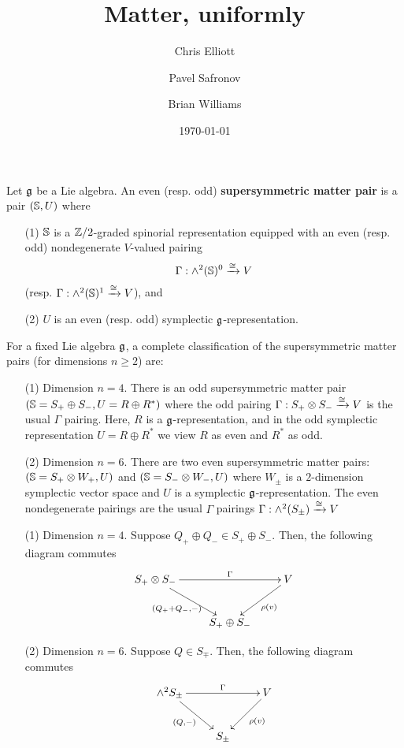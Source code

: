 \documentclass[10pt, oneside]{article}
\title{Matter, uniformly}
\author{Chris Elliott\and Pavel Safronov \and Brian Williams}
\date{\today}
\begin{document}
\maketitle

\begin{definition}
Let $\mathfrak g$ be a Lie algebra.
An even (resp. odd) {\bf supersymmetric matter pair} is a pair $(\mathbb S, U)$ where 
\begin{itemize}
\item[(1)] $\mathbb S$ is a $\mathbb Z/2$-graded spinorial representation equipped with an even (resp. odd) nondegenerate $V$-valued pairing
\[
\Gamma : \wedge^2(\mathbb S)^0 \xrightarrow{\cong} V
\]
(resp. $\Gamma : \wedge^2(\mathbb S)^1 \xrightarrow{\cong} V$), and

\item[(2)] $U$ is an even (resp. odd) symplectic $\mathfrak g$-representation.
\end{itemize}
\end{definition}

\begin{lem}
For a fixed Lie algebra $\mathfrak g$, a complete classification of the supersymmetric matter pairs  (for dimensions $n \geq 2$) are:
\begin{itemize}
\item[(1)] Dimension $n = 4$. 
There is an odd supersymmetric matter pair $(\mathbb S = S_+ \oplus S_-, U = R \oplus R^*)$ where the odd pairing $\Gamma : S_+ \otimes S_- \xrightarrow{\cong} V$ is the usual $\Gamma$ pairing. Here, $R$ is a $\mathfrak g$-representation, and in the odd symplectic representation $U = R \oplus R^*$ we view $R$ as even and $R^*$ as odd. 
\item[(2)] Dimension $n=6$.
There are two even supersymmetric matter pairs: $(\mathbb S = S_+ \otimes W_+, U)$ and $(\mathbb S = S_- \otimes W_-, U)$ where $W_\pm$ is a $2$-dimension symplectic vector space and $U$ is a symplectic $\mathfrak g$-representation. 
The even nondegenerate pairings are the usual $\Gamma$ pairings $\Gamma : \wedge^2 (S_\pm) \xrightarrow{\cong} V$ 
\end{itemize}
\end{lem}

\begin{prop}

\begin{itemize}
\item[(1)] Dimension $n = 4$.
Suppose $Q_+ \oplus Q_- \in S_+ \oplus S_-$.
Then, the following diagram commutes
\[
\xymatrix{
S_+ \otimes S_- \ar[dr]_-{(Q_+ + Q_-,-)} \ar[rr]^-{\Gamma} & & V \ar[dl]^-{\rho(v)} \\
& S_+ \oplus S_- &  
}
\]
\item[(2)] Dimension $n = 6$. 
Suppose $Q \in S_\mp$.
Then, the following diagram commutes
\[
\xymatrix{
\wedge^2 S_\pm \ar[dr]_-{(Q,-)} \ar[rr]^-{\Gamma} & & V \ar[dl]^-{\rho(v)} \\
& S_\pm & 
}
\]
\end{itemize}
\end{prop}
\end{document}
